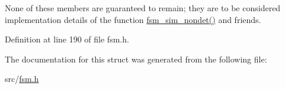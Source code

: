\-None of these members are guaranteed to remain; they are to be considered implementation details of the function \hyperlink{simulation_8c_ab39350b6a48388414f90cb3d248be612}{fsm\-\_\-sim\-\_\-nondet()} and friends. 

\-Definition at line 190 of file fsm.\-h.



\-The documentation for this struct was generated from the following file\-:\begin{DoxyCompactItemize}
\item 
src/\hyperlink{fsm_8h}{fsm.\-h}\end{DoxyCompactItemize}
